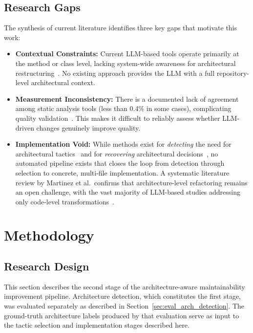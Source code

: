 \documentclass[sigconf,review,anonymous]{acmart}
\begin{document}
\subsection{Research Gaps}
The synthesis of current literature identifies three key gaps that motivate this work:
\begin{itemize}[nosep]
    \item \textbf{Contextual Constraints:} Current LLM-based tools operate primarily at the method or class level, lacking system-wide awareness for architectural restructuring~\cite{martinez2025refactoring, horikawa2025agentic}. No existing approach provides the LLM with a full repository-level architectural context.
    \item \textbf{Measurement Inconsistency:} There is a documented lack of agreement among static analysis tools (less than 0.4\% in some cases), complicating quality validation~\cite{lenarduzzi2023critical}. This makes it difficult to reliably assess whether LLM-driven changes genuinely improve quality.
    \item \textbf{Implementation Void:} While methods exist for \textit{detecting} the need for architectural tactics~\cite{marquez2022architectural} and for \textit{recovering} architectural decisions~\cite{shokri2024ipsynth}, no automated pipeline exists that closes the loop from detection through selection to concrete, multi-file implementation. A systematic literature review by Martinez et al.\ confirms that architecture-level refactoring remains an open challenge, with the vast majority of LLM-based studies addressing only code-level transformations~\cite{martinez2025refactoring}.
\end{itemize}

\section{Methodology}

\subsection{Research Design}

This section describes the second stage of the architecture-aware maintainability improvement pipeline. Architecture detection, which constitutes the first stage, was evaluated separately as described in Section~\ref{sec:eval_arch_detection}. The ground-truth architecture labels produced by that evaluation serve as input to the tactic selection and implementation stages described here.
\end{document}
